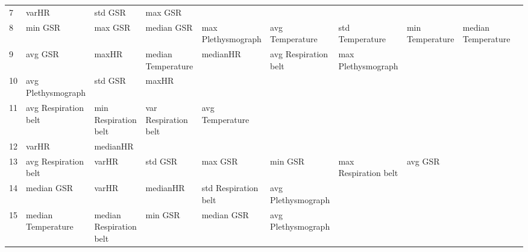 \begin{landscape}
\begin{table}[]
\begin{tabular}{l|llllllll}
7        & varHR                   & std GSR                 & max GSR                 &                         &                         &                       &                         &                         &                         &         \\
8        & min GSR                 & max GSR                 & median GSR              & max Plethysmograph      & avg Temperature         & std Temperature       & min Temperature         & median Temperature      &                         &         \\
9        & avg GSR                 & maxHR                   & median Temperature      & medianHR                & avg Respiration belt    & max Plethysmograph    &                         &                         &                         &         \\
10       & avg Plethysmograph      & std GSR                 & maxHR                   &                         &                         &                       &                         &                         &                         &         \\
11       & avg Respiration belt    & min Respiration belt    & var Respiration belt    & avg Temperature         &                         &                       &                         &                         &                         &         \\
12       & varHR                   & medianHR                &                         &                         &                         &                       &                         &                         &                         &         \\
13       & avg Respiration belt    & varHR                   & std GSR                 & max GSR                 & min GSR                 & max Respiration belt  & avg GSR                 &                         &                         &         \\
14       & median GSR              & varHR                   & medianHR                & std Respiration belt    & avg Plethysmograph      &                       &                         &                         &                         &         \\
15       & median Temperature      & median Respiration belt & min GSR                 & median GSR              & avg Plethysmograph      &                       &                         &                         &                         &         \\

\end{tabular}
\end{table}
\end{landscape}
